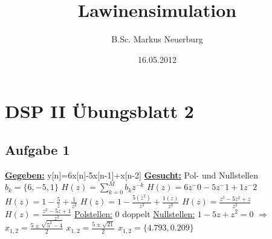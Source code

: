 \documentclass[12pt]{scrreprt}
\title{Lawinensimulation}
\author{B.Sc. Markus Neuerburg}
\date{16.05.2012}
\begin{document}
\setlength{\topmargin}{0cm}
\parindent 0pt
\section*{DSP II Übungsblatt 2}
\subsection*{Aufgabe 1}
\underline{\textbf{Gegeben:}}\newline
\hspace*{5mm}y[n]=6x[n]-5x[n-1]+x[n-2]\newline
\newline
\underline{\textbf{Gesucht:}}\newline
\hspace*{5mm}Pol- und Nullstellen\newline
\newline
\hspace*{5mm}$b_k=\{6,-5,1\}$\newline
\hspace*{5mm}$H(z)=\sum_{k=0}^{M}{b_k z^{-k}}$\newline
\hspace*{5mm}$H(z)=6z^-0-5z^-1+1z^-2$\newline
\hspace*{5mm}$H(z)=1-\frac{5}{z}+\frac{1}{z^2}$\newline
\hspace*{5mm}$H(z)=1-\frac{5(z^2)}{z^3}+\frac{1(z)}{z^3}$\newline
\hspace*{5mm}$H(z)=\frac{z^3-5z^2+z}{z^3}$\newline
\hspace*{5mm}$H(z)=\frac{z^2-5z+1}{z^2}$\newline
\hspace*{5mm}\underline{Polstellen:}\newline
\hspace*{5mm}0 doppelt\newline
\hspace*{5mm}\underline{Nullstellen:}\newline
\hspace*{5mm}$1-5z+z^2=0$\newline
\hspace*{5mm}$\Rightarrow$ $x_{1,2}=\frac{5 \pm \sqrt{5^2 - 4}}{2}$\newline
\hspace*{5mm}$x_{1,2}=\frac{5 \pm \sqrt{21}}{2}$\newline
\hspace*{5mm}$x_{1,2}=\{4.793, 0.209\}$
\end{document}
